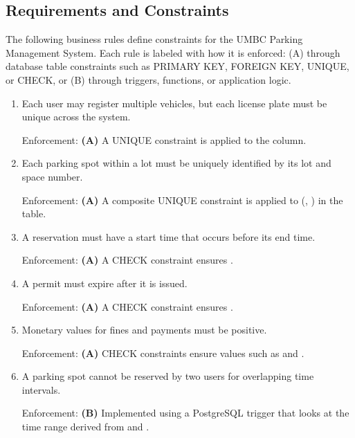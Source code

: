 \documentclass[12pt]{report}
\begin{document}
\subsection{Requirements and Constraints}

The following business rules define constraints for the UMBC Parking Management System. Each rule is labeled with how it is enforced: (A) through database table constraints such as PRIMARY KEY, FOREIGN KEY, UNIQUE, or CHECK, or (B) through triggers, functions, or application logic.

\begin{enumerate}[label=\textbf{Rule \arabic*:}]

\item Each user may register multiple vehicles, but each license plate must be unique across the system.

Enforcement: \textbf{(A)} A UNIQUE constraint is applied to the  column.

\item Each parking spot within a lot must be uniquely identified by its lot and space number.

Enforcement: \textbf{(A)} A composite UNIQUE constraint is applied to (, ) in the  table.

\item A reservation must have a start time that occurs before its end time.

Enforcement: \textbf{(A)} A CHECK constraint ensures . %

\item A permit must expire after it is issued.

Enforcement: \textbf{(A)} A CHECK constraint ensures .

\item Monetary values for fines and payments must be positive.

Enforcement: \textbf{(A)} CHECK constraints ensure values such as  and .

\item A parking spot cannot be reserved by two users for overlapping time intervals.

Enforcement: \textbf{(B)} Implemented using a PostgreSQL trigger that looks at the time range derived from  and .


\end{enumerate}
\end{document}
